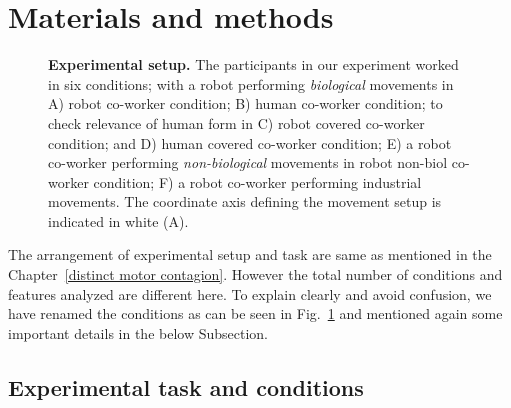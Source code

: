 
\section{Materials and methods} \label{methods}

\begin{figure}[b]
	\caption{{\bf Experimental setup.} The participants in our experiment worked in six conditions; with a robot performing \textit{biological} movements in A) robot co-worker condition; B) human co-worker condition; to check relevance of  human form in C) robot covered co-worker condition; and D) human covered co-worker condition; E) a robot co-worker performing \textit{non-biological} movements in robot non-biol co-worker condition; F) a robot co-worker performing industrial movements. The coordinate axis defining the movement setup is indicated in white (A).}
	\label{fig:setup1}
\end{figure}

The arrangement of experimental setup and task are same as mentioned in the Chapter~\ref{distinct motor contagion}. However the total number of conditions and features analyzed are different here. To explain clearly and avoid confusion, we have renamed the conditions as can be seen in Fig.~\ref{fig:setup1} and mentioned again some important details in the below Subsection.

\subsection{Experimental task and conditions}

